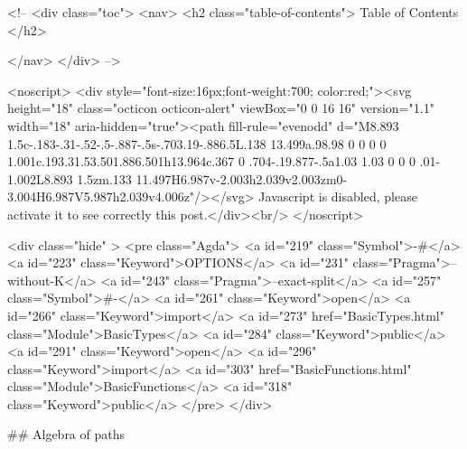   <!-- 
  <div class="toc">
    <nav>
    <h2 class="table-of-contents"> Table of Contents </h2>
      

    </nav>
  </div>
   -->

  <noscript>
  <div style="font-size:16px;font-weight:700; color:red;"><svg height="18" class="octicon octicon-alert" viewBox="0 0 16 16" version="1.1" width="18" aria-hidden="true"><path fill-rule="evenodd" d="M8.893 1.5c-.183-.31-.52-.5-.887-.5s-.703.19-.886.5L.138 13.499a.98.98 0 0 0 0 1.001c.193.31.53.501.886.501h13.964c.367 0 .704-.19.877-.5a1.03 1.03 0 0 0 .01-1.002L8.893 1.5zm.133 11.497H6.987v-2.003h2.039v2.003zm0-3.004H6.987V5.987h2.039v4.006z"/></svg> Javascript is disabled, please activate it to see correctly this post.</div><br/>
  </noscript>

  <div class="hide" >
<pre class="Agda">
<a id="219" class="Symbol">{-#</a> <a id="223" class="Keyword">OPTIONS</a> <a id="231" class="Pragma">--without-K</a> <a id="243" class="Pragma">--exact-split</a> <a id="257" class="Symbol">#-}</a>
<a id="261" class="Keyword">open</a> <a id="266" class="Keyword">import</a> <a id="273" href="BasicTypes.html" class="Module">BasicTypes</a> <a id="284" class="Keyword">public</a>
<a id="291" class="Keyword">open</a> <a id="296" class="Keyword">import</a> <a id="303" href="BasicFunctions.html" class="Module">BasicFunctions</a> <a id="318" class="Keyword">public</a>
</pre>
</div>

## Algebra of paths

